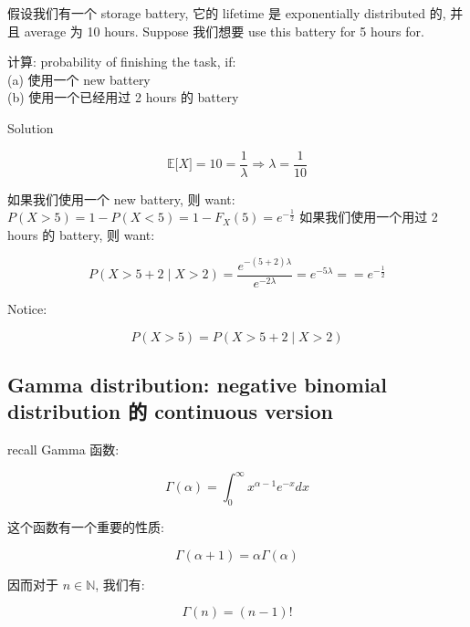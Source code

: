\begin{example}

假设我们有一个 storage battery, 它的 lifetime 是 exponentially distributed 的, 并且 average 为 10 hours. Suppose 我们想要 use this battery for 5 hours for.

计算: probability of finishing the task, if:\\
(a) 使用一个 new battery\\
(b) 使用一个已经用过 2 hours 的 battery\\

\end{example}

\begin{qlsolution}{Solution}

\[\mathbb{E}\lbrack\mathit{X}\rbrack = 10 = \frac{1}{\mathit{\lambda}}\Longrightarrow\mathit{\lambda} = \frac{1}{10}\]

如果我们使用一个 new battery, 则 want: \(\mathit{P}(\mathit{X} > 5) = 1 - \mathit{P}(\mathit{X} < 5) = 1 - \mathit{F}_{\mathit{X}}(5) = \mathit{e}^{- \frac{1}{2}}\) 如果我们使用一个用过 2 hours 的 battery, 则 want:

\[\mathit{P}(\mathit{X} > 5 + 2 \mid \mathit{X} > 2) = \frac{\mathit{e}^{- (5 + 2)\mathit{\lambda}}}{\mathit{e}^{- 2\mathit{\lambda}}} = \mathit{e}^{- 5\mathit{\lambda}} = = \mathit{e}^{- \frac{1}{2}}\]

Notice:

\[\mathit{P}(\mathit{X} > 5) = \mathit{P}(\mathit{X} > 5 + 2 \mid \mathit{X} > 2)\]

\end{qlsolution}

\subsection{Gamma distribution: negative binomial distribution 的 continuous version}\label{gamma-distribution-negative-binomial-distribution-ux7684-continuous-version}

recall Gamma 函数:

\[\Gamma(\mathit{\alpha}) = \int_{0}^{\infty}\mathit{x}^{\mathit{\alpha} - 1}\mathit{e}^{- \mathit{x}}\mathit{d}\mathit{x}\]

这个函数有一个重要的性质:

\[\Gamma(\mathit{\alpha} + 1) = \mathit{\alpha}\Gamma(\mathit{\alpha})\]

因而对于 \(\mathit{n} \in \mathbb{N}\), 我们有:

\[\Gamma(\mathit{n}) = (\mathit{n} - 1)!\]

